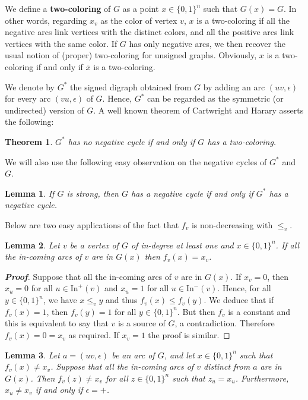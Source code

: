 \documentclass[11pt,a4paper]{article}
\newtheorem{lemma}{Lemma}
\newtheorem{theorem}{Theorem}
\def\B{\{0,1\}}
\def\In{\mathrm{In}}
\def\e{\epsilon}
\begin{document}
We define a {\bf two-coloring} of $G$ as a point $x\in\B^n$ such that $G(x)=G$. In other words, regarding $x_v$ as the color of vertex $v$, $x$ is a two-coloring if all the negative arcs link vertices with the distinct colors, and all the positive arcs link vertices with the same color. If $G$ has only negative arcs, we then recover the usual notion of (proper) two-coloring for unsigned graphs. Obviously, $x$ is a two-coloring if and only if $\overline{x}$ is a two-coloring. 

\medskip
We denote by $G^*$ the signed digraph obtained from $G$ by adding an arc $(uv,\e)$ for every arc $(vu,\e)$ of $G$. Hence, $G^*$ can be regarded as the symmetric (or undirected) version of $G$. A well known theorem of Cartwright and Harary \cite{CH56} asserts the following: 

\begin{theorem}\label{thm_Harary}
$G^*$ has no negative cycle if and only if $G$ has a two-coloring.
\end{theorem}

We will also use the following easy observation on the negative cycles of $G^*$ and $G$. 

\begin{lemma}\label{lem_GG*}
If $G$ is strong, then $G$ has a negative cycle if and only if $G^*$ has a negative cycle.
\end{lemma}

Below are two easy applications of the fact that $f_v$ is non-decreasing with $\leq_v$.

\begin{lemma}\label{lem_ex_1}
Let $v$ be a vertex of $G$ of in-degree at least one and $x\in\B^n$. If all the in-coming arcs of $v$ are in $G(x)$ then $f_v(x)=x_v$. 
\end{lemma}


\begin{proof}[{\bf Proof}]
Suppose that all the in-coming arcs of $v$ are in $G(x)$. If $x_v=0$, then $x_u=0$ for all $u\in\In^+(v)$ and $x_u=1$ for all $u\in\In^-(v)$. Hence, for all $y\in\B^n$, we have $x\leq_v y$ and thus $f_v(x)\leq f_v(y)$. We deduce that if $f_v(x)=1$, then $f_v(y)=1$ for all $y\in\B^n$. But then $f_v$ is a constant and this is equivalent to say that $v$ is a source of $G$, a contradiction. Therefore $f_v(x)=0=x_v$ as required. If $x_v=1$ the proof is similar. 
\end{proof}

\begin{lemma}\label{lem_ex_2}
Let $a=(uv,\e)$ be an arc of $G$, and let $x\in\B^n$ such that $f_v(x)\neq x_v$. Suppose that all the in-coming arcs of $v$ distinct from $a$ are in $G(x)$. Then $f_v(z)\neq x_v$ for all $z\in\B^n$ such that $z_u=x_u$. Furthermore, $x_u\neq x_v$ if and only if $\e=+$. 
\end{lemma}
\end{document}
